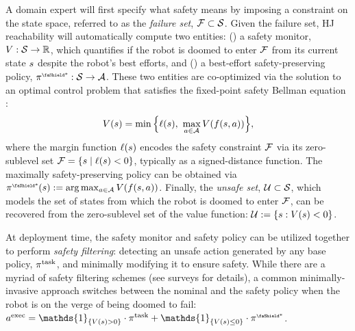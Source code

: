 A domain expert will first specify what safety means by imposing a constraint on the state space, referred to as the \textit{failure set}, $\mathcal{F} \subset \mathcal{S}$. 
Given the failure set, HJ reachability will automatically compute two entities: () a safety monitor, $V: \mathcal{S} \rightarrow \mathbb{R}$, which quantifies if the robot is doomed to enter $\mathcal{F}$ from its current state $s$ despite the robot's best efforts, and () a best-effort safety-preserving policy, $\fallback: \stateSpace \rightarrow \actionSpace$. 
These two entities are co-optimized via the solution to an optimal control problem that satisfies the fixed-point safety Bellman equation \cite{fisac2019bridging}:
\begin{equation}
        V(s) = \min \Big\{ \ell(s), ~ \max_{a \in \mathcal{A}} V(f(s, a)) \Big\},
        \label{eq:trad-fixed-pt-bellman}
\end{equation}
where the margin function $\ell(s)$ encodes the safety constraint $\mathcal{F}$ via its zero-sublevel set $\mathcal{F} = \{ s \; | \; \ell(s) < 0 \}$, typically as a signed-distance function.  
The maximally safety-preserving policy can be obtained via $\fallback(\state) := \arg\max_{\action \in \actionSpace} \valfunc(\dyns(\state, \action))$. Finally, the \textit{unsafe set}, $\mathcal{U} \subset \mathcal{S}$, which models the set of states from which the robot is doomed to enter $\mathcal{F}$, can be recovered from the zero-sublevel set of the value function: $\mathcal{U} := \{s : V(s) < 0\}$.

At deployment time, the safety monitor and safety policy can be utilized together to perform \textit{safety filtering}: detecting an unsafe action generated by any base policy, $\pi^{\text{task}}$, and minimally modifying it to ensure safety.
While there are a myriad of safety filtering schemes (see surveys \cite{wabersich2023data, hsu2023safety} for details), a common minimally-invasive approach switches between the nominal and the safety policy when the robot is on the verge of being doomed to fail: $\action^\text{exec} = \mathds{1}_{\{\valfunc(\state) > 0\}} \cdot \policyTask + \mathds{1}_{\{\valfunc(\state) \le 0\}} \cdot \fallback$.

